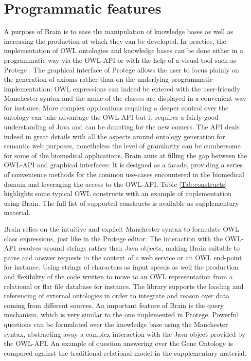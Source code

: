 \documentclass{bioinfo}
\begin{document}
\section{Programmatic features}
A purpose of Brain is to ease the manipulation of knowledge bases as well as increasing the production at which they can be developed.
In practice, the implementation of OWL ontologies and knowledge bases can be done either in a programmatic way 
via the OWL-API \citep{MatthewHorridge2011} or with the
help of a visual tool such as Protege \citep{StanfordCenterforBiomedicalInformaticsResearch}. 
The graphical interface of Protege allows the user to focus 
plainly on the generation of axioms rather than on the underlying programmatic implementation:
OWL expressions can indeed be entered 
with the user-friendly Manchester syntax and the name of the classes are displayed in a convenient way for instance. 
More complex applications requiring a deeper control over the ontology
can take advantage the OWL-API but it requires a fairly good understanding of Java and can be daunting for the new comers.
The API deals indeed in great details with all the aspects around ontology generation for semantic web purposes, nonetheless the 
level of granularity can be cumbersome for some of the biomedical applications. Brain aims at filling the gap between the OWL-API
and graphical interfaces: It is designed as a facade, providing a series of convenience methods for the common
use-cases encountered in the biomedical domain and leveraging the access to the OWL-API. 
Table \ref{Tab:constructs} highlights some typical OWL constructs 
with an example of implementation using Brain.
The full list of supported constructs is available as supplementary material.

Brain relies on the intuitive and explicit Manchester syntax to formulate OWL class expressions, just like in the Protege editor.
The interaction with the OWL-API resolves around strings rather than Java objects, making Brain suitable to parse and answer requests in 
the context of a web service or an OWL end-point for instance. Using strings of characters as input speeds as well the production 
and flexibility of the code written to move to an OWL representation from a relational or flat file database for instance.
The library supports the loading and referencing of external ontologies in order to integrate and reason
over data coming from different sources. An important feature of Brain is the query mechanism, which is very similar to 
the one implemented in Protege. Powerful questions can be formulated over the knowledge base using the Manchester syntax, abstracting
away a complex interaction with the Java object provided by the OWL-API. An example of question answering over the Gene Ontology
is compared against the traditional relational model in the supplementary material.
\end{document}
